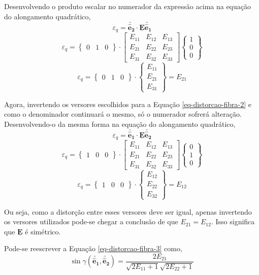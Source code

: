 	Desenvolvendo o produto escalar no numerador da expressão acima na equação do alongamento quadrático,
	\[\varepsilon_q=\utilde{\mathbf{\hat{e}_2}}\cdot\underline{\mathbf{E}}\utilde{\mathbf{\hat{e}_1}}\]
	\[
	\varepsilon_q
	=
	\begin{Bmatrix}
	0 & 1 & 0
	\end{Bmatrix}
	\cdot
	\begin{bmatrix}
	E_{11} & E_{12} & E_{13} \\
	E_{21} & E_{22} & E_{23} \\
	E_{31} & E_{32} & E_{33}
	\end{bmatrix}
	\begin{Bmatrix}
	1 \\ 0 \\ 0
	\end{Bmatrix}
	\]
	\[
	\varepsilon_q
	=
	\begin{Bmatrix}
	0 & 1 & 0
	\end{Bmatrix}
	\cdot
	\begin{Bmatrix}
	E_{11} \\ E_{21} \\ E_{31}
	\end{Bmatrix}
	=
	E_{21}	
	\]
	
	Agora, invertendo os versores escolhidos para a Equação \eqref{eq-distorcao-fibra-2} e como o denominador continuará o mesmo, só o numerador sofrerá alteração. Desenvolvendo-o da mesma forma na equação do alongamento quadrático,
	\[\varepsilon_q=\utilde{\mathbf{\hat{e}_1}}\cdot\underline{\mathbf{E}}\utilde{\mathbf{\hat{e}_2}}\]
	\[
	\varepsilon_q
	=
	\begin{Bmatrix}
	1 & 0 & 0
	\end{Bmatrix}
	\cdot
	\begin{bmatrix}
	E_{11} & E_{12} & E_{13} \\
	E_{21} & E_{22} & E_{23} \\
	E_{31} & E_{32} & E_{33}
	\end{bmatrix}
	\begin{Bmatrix}
	0 \\ 1 \\ 0
	\end{Bmatrix}
	\]
	\[
	\varepsilon_q
	=
	\begin{Bmatrix}
	1 & 0 & 0
	\end{Bmatrix}
	\cdot
	\begin{Bmatrix}
	E_{12} \\ E_{22} \\ E_{32}
	\end{Bmatrix}
	=
	E_{12}
	\]
	
	Ou seja, como a distorção entre esses versores deve ser igual, apenas invertendo os versores utilizados pode-se chegar a conclusão de que $E_{21}=E_{12}$. Isso significa que $\underline{\mathbf{E}}$ é simétrico.
	
	Pode-se reescrever a Equação \eqref{eq-distorcao-fibra-3} como,
	\[\sin\gamma(\utilde{\mathbf{\hat{e}_1}},\utilde{\mathbf{\hat{e}_2}})=\frac{2E_{21}}{\displaystyle\sqrt{2E_{11}+1}\sqrt{2E_{22}+1}}\]